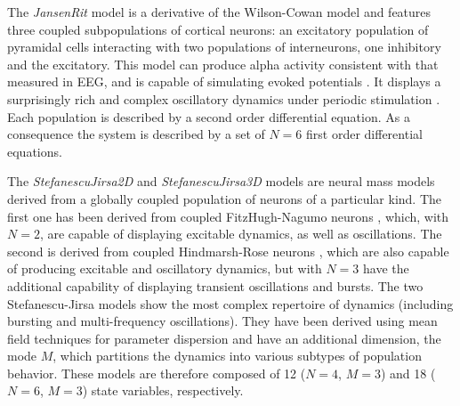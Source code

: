 \documentclass{bioinfo}
\newcommand*{\tvbclass}[1]{{\ttfamily\emph{#1}}}    %
\begin{document}
\begin{methods}
    
    The \tvbclass{JansenRit} model \citep{Jansen_1995} is a derivative of the
    Wilson-Cowan model and features three coupled subpopulations of cortical
    neurons: an excitatory population of pyramidal cells interacting with two
    populations of interneurons, one inhibitory and the excitatory.  This
    model can produce alpha activity consistent with that measured in EEG, and is
    capable of simulating evoked potentials \citep{Jansen_1993}. It displays a
    surprisingly rich and complex oscillatory dynamics under periodic
    stimulation  \citep{Spiegler_2010}. Each population is described by a
    second order differential equation. As a consequence the system is
    described by a set of $N=6$ first order differential equations.
    
    
    The \tvbclass{StefanescuJirsa2D} and \tvbclass{StefanescuJirsa3D} models
    \citep{Stefanescu_2008, Jirsa_2010, Stefanescu_2011} are neural mass
    models derived from a globally coupled population of neurons of a
    particular kind. The  first one has been derived from coupled 
    FitzHugh-Nagumo neurons  \citep{FitzHugh_1961, Nagumo_1962}, which, with $N=2$, are
    capable of  displaying excitable dynamics, as well as oscillations. The
    second is  derived from coupled Hindmarsh-Rose neurons
    \citep{Hindmarsh_1984}, which are also capable of producing excitable and
    oscillatory dynamics, but  with $N=3$ have the additional capability of
    displaying transient  oscillations and bursts. The two Stefanescu-Jirsa
    models show the most complex  repertoire of dynamics (including bursting
    and multi-frequency oscillations).  They have been derived using mean
    field techniques for parameter dispersion  \citep{Assisi_2005} and have an
    additional dimension, the mode $M$, which partitions  the dynamics into
    various subtypes of population behavior. These models are therefore
    composed of 12 ($N=4$, $M=3$) and 18 ($N=6$, $M=3$) state variables,
    respectively.
    

\end{methods}
\end{document}
